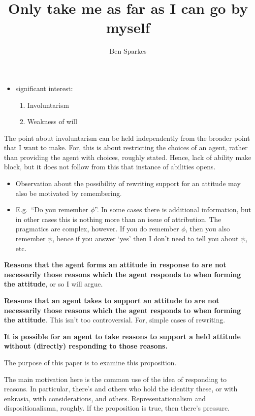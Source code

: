 \documentclass[10pt]{article}
\title{Only take me as far as I can go by myself}
\author{Ben Sparkes}
\newcommand{\hozlinedash}[0]{%
  \noindent\hdashrule[0.5ex][c]{\textwidth}{.1pt}{2.5pt}
}
\begin{document}
\tableofcontents

\hozlinedash

\begin{itemize}
\item significant interest:
  \begin{enumerate}
  \item Involuntarism
  \item Weakness of will
  \end{enumerate}
\end{itemize}

\begin{note}
  The point about involuntarism can be held independently from the broader point that I want to make.
  For, this is about restricting the choices of an agent, rather than providing the agent with choices, roughly stated.
  Hence, lack of ability make block, but it does not follow from this that instance of abilities opens.
\end{note}

\begin{itemize}
\item Observation about the possibility of rewriting support for an attitude may also be motivated by remembering.
\item E.g.\ ``Do you remember \(\phi\)''.
  In some cases there is additional information, but in other cases this is nothing more than an issue of attribution.
  The pragmatics are complex, however.
  If you do remember \(\phi\), then you also remember \(\psi\), hence if you answer `yes' then I don't need to tell you about \(\psi\), etc.
\end{itemize}

\newpage

\textbf{Reasons that the agent forms an attitude in response to are not necessarily those reasons which the agent responds to when forming the attitude}, or so I will argue.

\textbf{Reasons that an agent takes to support an attitude to are not necessarily those reasons which the agent responds to when forming the attitude}.
This isn't too controversial.
For, simple cases of rewriting.


\textbf{It is possible for an agent to take reasons to support a held attitude without (directly) responding to those reasons.}

The purpose of this paper is to examine this proposition.

The main motivation here is the common use of the idea of responding to reasons.
In particular, there's \citeauthor{Lord:2018aa} and others who hold the identity these, or \citeauthor{Broome:2013aa} with enkrasia, \citeauthor{Hieronymi:2018aa} with considerations, and others.
Representationalism and dispositionalismn, roughly.
If the proposition is true, then there's pressure.
\end{document}
